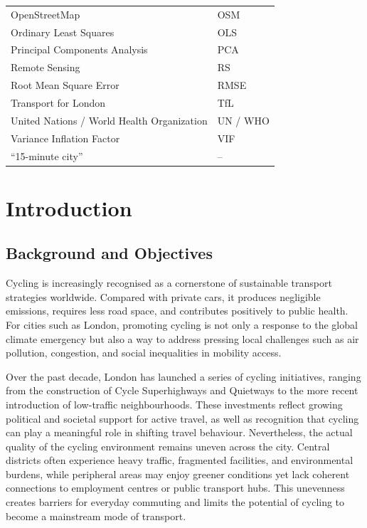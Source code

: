 \documentclass[
  12pt,
  oneside]{book}
\begin{document}
\begin{table}
\begin{tabular}{ll}
OpenStreetMap & OSM\\
Ordinary Least Squares & OLS\\
Principal Components Analysis & PCA\\
Remote Sensing & RS\\
\addlinespace
Root Mean Square Error & RMSE\\
Transport for London & TfL\\
United Nations / World Health Organization & UN / WHO\\
Variance Inflation Factor & VIF\\
“15-minute city” & –\\
\bottomrule
\end{tabular}
\end{table}

\chapter{Introduction}\label{introduction}


\section{Background and Objectives}\label{background-and-objectives}

Cycling is increasingly recognised as a cornerstone of sustainable transport strategies worldwide. Compared with private cars, it produces negligible emissions, requires less road space, and contributes positively to public health. For cities such as London, promoting cycling is not only a response to the global climate emergency but also a way to address pressing local challenges such as air pollution, congestion, and social inequalities in mobility access.

Over the past decade, London has launched a series of cycling initiatives, ranging from the construction of Cycle Superhighways and Quietways to the more recent introduction of low-traffic neighbourhoods. These investments reflect growing political and societal support for active travel, as well as recognition that cycling can play a meaningful role in shifting travel behaviour. Nevertheless, the actual quality of the cycling environment remains uneven across the city. Central districts often experience heavy traffic, fragmented facilities, and environmental burdens, while peripheral areas may enjoy greener conditions yet lack coherent connections to employment centres or public transport hubs. This unevenness creates barriers for everyday commuting and limits the potential of cycling to become a mainstream mode of transport.
\end{document}

